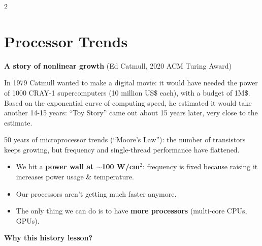\documentclass[a4paper,9pt]{extarticle}
\begin{document}

\thispagestyle{fancy}



\raggedcolumns
\begin{multicols}{2}


\section{Processor Trends}


\begin{example}

\textbf{A story of nonlinear growth} (Ed Catmull, 2020 ACM Turing Award)

In 1979 Catmull wanted to make a digital movie: it would have needed the power of 1000
CRAY-1 supercomputers (10 million US\$ each), with a budget of 1M\$. Based on the exponential
curve of computing speed, he estimated it would take another 14-15 years: ``Toy Story'' came
out about 15 years later, very close to the estimate.

\end{example}


\begin{important}

50 years of microprocessor trends (``Moore's Law''): the number of transistors keeps growing,
but frequency and single-thread performance have flattened.

\begin{itemize}

\item We hit a \textbf{power wall at $\sim$100 W/cm$^2$}: frequency is fixed because raising
it increases power usage \& temperature.

\item Our processors aren't getting much faster anymore.

\item The only thing we can do is to have \textbf{more processors} (multi-core CPUs, GPUs).

\end{itemize}

\end{important}


\begin{summary}

\textbf{Why this history lesson?}


\end{summary}
\end{multicols}
\end{document}

